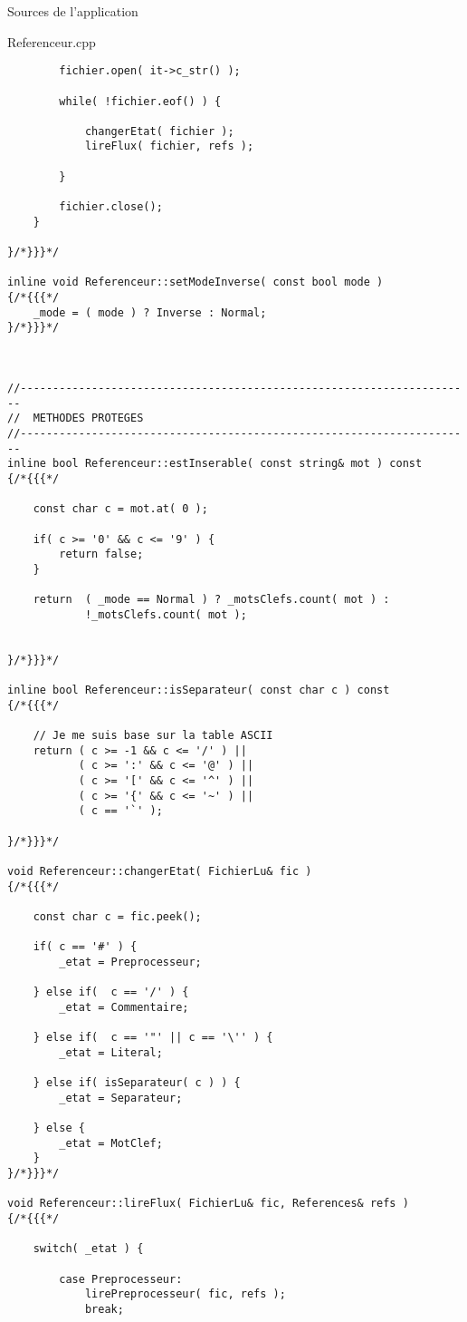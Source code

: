 \documentclass{article}
\begin{document}
\begin{section}{Sources de l'application}
\begin{paragraph}{Referenceur.cpp}
\begin{verbatim}
        fichier.open( it->c_str() );

        while( !fichier.eof() ) {

            changerEtat( fichier );
            lireFlux( fichier, refs );

        }

        fichier.close();
    }

}/*}}}*/

inline void Referenceur::setModeInverse( const bool mode )
{/*{{{*/
    _mode = ( mode ) ? Inverse : Normal;
}/*}}}*/



//----------------------------------------------------------------------
//  METHODES PROTEGES
//----------------------------------------------------------------------
inline bool Referenceur::estInserable( const string& mot ) const
{/*{{{*/

    const char c = mot.at( 0 );

    if( c >= '0' && c <= '9' ) {
        return false;
    }

    return  ( _mode == Normal ) ? _motsClefs.count( mot ) :
            !_motsClefs.count( mot );


}/*}}}*/

inline bool Referenceur::isSeparateur( const char c ) const
{/*{{{*/

    // Je me suis base sur la table ASCII
    return ( c >= -1 && c <= '/' ) ||
           ( c >= ':' && c <= '@' ) ||
           ( c >= '[' && c <= '^' ) ||
           ( c >= '{' && c <= '~' ) ||
           ( c == '`' );

}/*}}}*/

void Referenceur::changerEtat( FichierLu& fic )
{/*{{{*/

    const char c = fic.peek();

    if( c == '#' ) {
        _etat = Preprocesseur;

    } else if(  c == '/' ) {
        _etat = Commentaire;

    } else if(  c == '"' || c == '\'' ) {
        _etat = Literal;

    } else if( isSeparateur( c ) ) {
        _etat = Separateur;

    } else {
        _etat = MotClef;
    }
}/*}}}*/

void Referenceur::lireFlux( FichierLu& fic, References& refs )
{/*{{{*/

    switch( _etat ) {

        case Preprocesseur:
            lirePreprocesseur( fic, refs );
            break;


\end{verbatim}
\end{paragraph}
\end{section}
\end{document}
